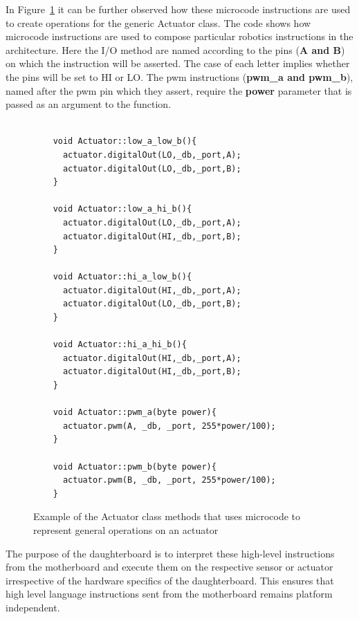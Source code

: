 	In Figure~\ref{code:instr} it can be further observed how these microcode instructions are used to create operations for the generic Actuator class.
The code shows how microcode instructions are used to compose particular robotics instructions in the \xten architecture. Here the I/O method are named according to the pins (\textbf{A and B}) on which the instruction will be asserted. The case of each letter implies whether the pins will be set to HI or LO. The pwm instructions (\textbf{pwm\_a and pwm\_b}), named after the pwm pin which they assert, require the \textbf{power} parameter that is passed as an argument to the function.
	
    \begin{figure}
    \footnotesize
    {\fontsize{8}{6}\selectfont
    \begin{verbatim}

    void Actuator::low_a_low_b(){
      actuator.digitalOut(LO,_db,_port,A);
      actuator.digitalOut(LO,_db,_port,B);
    }

    void Actuator::low_a_hi_b(){
      actuator.digitalOut(LO,_db,_port,A);
      actuator.digitalOut(HI,_db,_port,B);
    }

    void Actuator::hi_a_low_b(){
      actuator.digitalOut(HI,_db,_port,A);
      actuator.digitalOut(LO,_db,_port,B);
    }

    void Actuator::hi_a_hi_b(){
      actuator.digitalOut(HI,_db,_port,A);
      actuator.digitalOut(HI,_db,_port,B);
    }

    void Actuator::pwm_a(byte power){
      actuator.pwm(A, _db, _port, 255*power/100);
    }

    void Actuator::pwm_b(byte power){
      actuator.pwm(B, _db, _port, 255*power/100);
    }

    \end{verbatim}
    }
    \caption{Example of the Actuator class methods that uses microcode to represent general operations on an actuator} \label{code:instr}
    \end{figure}
    
	The purpose of the daughterboard is to interpret these high-level instructions from the motherboard and execute them on the respective sensor or actuator irrespective of the hardware specifics of the daughterboard. This ensures that high level language instructions sent from the motherboard remains platform independent.
	
	
	
